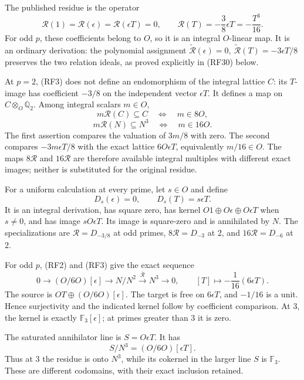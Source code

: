 \documentclass[
]{article}
\begin{document}
The published residue is the operator \[
\mathcal R(1)=\mathcal R(\epsilon)=\mathcal R(\epsilon T)=0,\qquad
\mathcal R(T)=-\frac38\epsilon T=-\frac{T^3}{16}.
\tag{RF3}
\] For odd \(p\), these coefficients belong to \(O\), so it is an
integral \(O\)-linear map. It is an ordinary derivation: the polynomial
assignment \(\widetilde{\mathcal R}(\epsilon)=0,\ 
\widetilde{\mathcal R}(T)=-3\epsilon T/8\) preserves the two relation
ideals, as proved explicitly in (RF30) below.

At \(p=2\), (RF3) does not define an endomorphism of the integral
lattice \(C\): its \(T\)-image has coefficient \(-3/8\) on the
independent vector \(\epsilon T\). It defines a map on
\(C\otimes_O\mathbb Q_2\). Among integral scalars \(m\in O\), \[
m\mathcal R(C)\subseteq C
\quad\Longleftrightarrow\quad m\in8O,
\] \[
m\mathcal R(N)\subseteq N^3
\quad\Longleftrightarrow\quad m\in16O.
\tag{RF4}
\] The first assertion compares the valuation of \(3m/8\) with zero. The
second compares \(-3m\epsilon T/8\) with the exact lattice
\(6O\epsilon T\), equivalently \(m/16\in O\). The maps \(8\mathcal R\)
and \(16\mathcal R\) are therefore available integral multiples with
different exact images; neither is substituted for the original residue.

For a uniform calculation at every prime, let \(s\in O\) and define \[
D_s(\epsilon)=0,\qquad D_s(T)=s\epsilon T.
\tag{RF5}
\] It is an integral derivation, has square zero, has kernel
\(O1\oplus O\epsilon\oplus O\epsilon T\) when \(s\ne0\), and has image
\(sO\epsilon T\). Its image is square-zero and is annihilated by \(N\).
The specializations are \(\mathcal R=D_{-3/8}\) at odd primes,
\(8\mathcal R=D_{-3}\) at 2, and \(16\mathcal R=D_{-6}\) at 2.

For odd \(p\), (RF2) and (RF3) give the exact sequence \[
0\longrightarrow(O/6O)[\epsilon]
\longrightarrow N/N^2
\xrightarrow{\overline{\mathcal R}}N^3
\longrightarrow0,
\qquad
[T]\longmapsto-\frac1{16}(6\epsilon T).
\tag{RF6}
\] The source is \(OT\oplus(O/6O)[\epsilon]\). The target is free on
\(6\epsilon T\), and \(-1/16\) is a unit. Hence surjectivity and the
indicated kernel follow by coefficient comparison. At 3, the kernel is
exactly \(\mathbb F_3[\epsilon]\); at primes greater than 3 it is zero.

The saturated annihilator line is \(S=O\epsilon T\). It has \[
S/N^3=(O/6O)[\epsilon T].
\tag{RF7}
\] Thus at 3 the residue is onto \(N^3\), while its cokernel in the
larger line \(S\) is \(\mathbb F_3\). These are different codomains,
with their exact inclusion retained.
\end{document}
